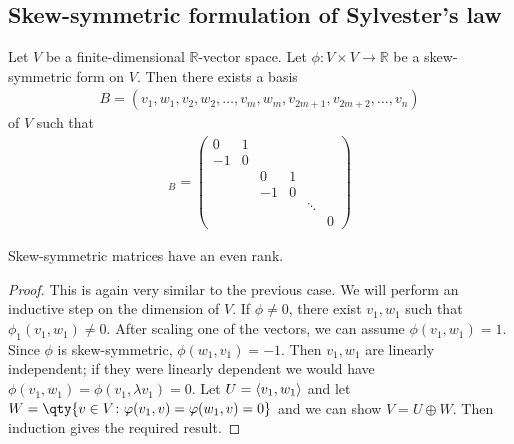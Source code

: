 \subsection{Skew-symmetric formulation of Sylvester's law}
\begin{theorem}
	Let $V$ be a finite-dimensional $\mathbb R$-vector space.
	Let $\phi \colon V \times V \to \mathbb R$ be a skew-symmetric form on $V$.
	Then there exists a basis
	\begin{align*}
		B = (v_1, w_1, v_2, w_2, \dots, v_m, w_m, v_{2m+1}, v_{2m+2}, \dots, v_n)
	\end{align*}
	of $V$ such that
	\begin{align*}
		[\phi]_B = \begin{pmatrix}
			0  & 1                       \\
			-1 & 0                       \\
			   &   & 0  & 1              \\
			   &   & -1 & 0              \\
			   &   &    &   & \ddots     \\
			   &   &    &   &        & 0
		\end{pmatrix}
	\end{align*}
\end{theorem}
\begin{corollary}
	Skew-symmetric matrices have an even rank.
\end{corollary}
\begin{proof}
	This is again very similar to the previous case.
	We will perform an inductive step on the dimension of $V$.
	If $\phi \neq 0$, there exist $v_1, w_1$ such that $\phi_1(v_1, w_1) \neq 0$.
	After scaling one of the vectors, we can assume $\phi(v_1, w_1) = 1$.
	Since $\phi$ is skew-symmetric, $\phi(w_1, v_1) = -1$.
	Then $v_1, w_1$ are linearly independent; if they were linearly dependent we would have $\phi(v_1, w_1) = \phi(v_1, \lambda v_1) = 0$.
	Let $U = \langle{} v_1, w_1 \rangle$ and let $W = \qty{v \in V \colon \phi(v_1, v) = \phi(w_1, v) = 0}$ and we can show $V = U \oplus W$.
	Then induction gives the required result.
\end{proof}